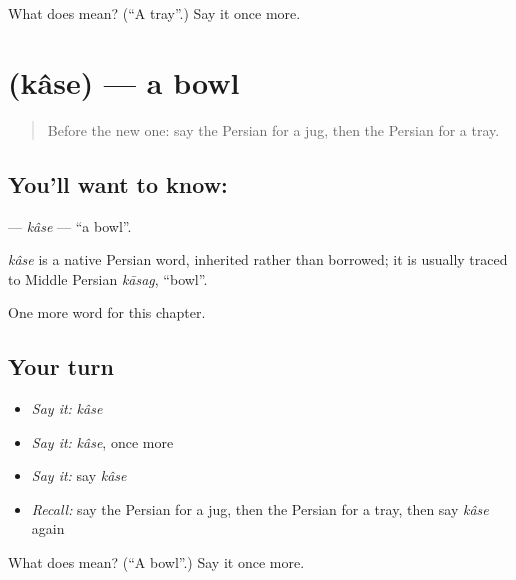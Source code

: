 \begin{tcolorbox}[breakable,colback=teal!4,colframe=teal!35!black,title={Before you move on}]
What does  mean? (\textquotedblleft{}A tray\textquotedblright{}.) Say it once more.
\end{tcolorbox}
\section[\texorpdfstring{\fa{کاسه} (kâse)}{کاسه (kâse)}]{ (kâse) — a bowl}

\label{lesson:FA-C111-kase}



\begin{quote}
Before the new one: say the Persian for a jug, then the Persian for a tray.
\end{quote}

\subsection*{You'll want to know: }
\textbf{} — \emph{kâse} — \textquotedblleft{}a bowl\textquotedblright{}.

\begin{cousinweb}
\emph{kâse} is a native Persian word, inherited rather than borrowed; it is usually traced to Middle Persian \emph{kāsag}, \textquotedblleft{}bowl\textquotedblright{}.
\end{cousinweb}

\begin{grammarlens}[title={What you've built}]
One more word for this chapter.
\end{grammarlens}

\subsection*{Your turn}
\begin{itemize}
\raggedright
  \item \emph{Say it:} \emph{kâse}
  \item \emph{Say it:} \emph{kâse}, once more
  \item \emph{Say it:} say \emph{kâse}
  \item \emph{Recall:} say the Persian for a jug, then the Persian for a tray, then say \emph{kâse} again
\end{itemize}

\begin{tcolorbox}[breakable,colback=teal!4,colframe=teal!35!black,title={Before you move on}]
What does  mean? (\textquotedblleft{}A bowl\textquotedblright{}.) Say it once more.
\end{tcolorbox}
